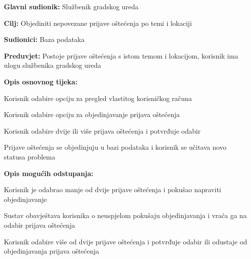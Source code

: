 \noindent {}
\begin{packed_item}

	\item \textbf{Glavni sudionik: } Službenik gradskog ureda
	\item  \textbf{Cilj:} Objediniti nepovezane prijave oštećenja po temi i lokaciji
	\item  \textbf{Sudionici:} Baza podataka
	\item  \textbf{Preduvjet:} Postoje prijave oštećenja s istom temom i lokacijom, korisnik ima ulogu službenika gradskog ureda
	\item  \textbf{Opis osnovnog tijeka:}

	\item[] \begin{packed_enum}

		\item Korisnik odabire opciju za pregled vlastitog korisničkog računa
		\item Korisnik odabire opciju za objedinjavanje prijava oštećenja
		\item Korisnik odabire dvije ili više prijava oštećenja i potvrđuje odabir
		\item Prijave oštećenja se objedinjuju u bazi podataka i korisnik se učitava novo statusa problema
	\end{packed_enum}

	\item  \textbf{Opis mogućih odstupanja:}

	\item[] \begin{packed_item}

		\item[3.a] Korisnik je odabrao manje od dvije prijave oštećenja i pokušao napraviti objedinjavanje
		\item[] \begin{packed_enum}

			\item Sustav obavještava korisnika o neuspjelom pokušaju objedinjavanja i vraća ga na odabir prijava oštećenja
			\item Korisnik odabire više od dvije prijave oštećenja i potvrđuje odabir ili odustaje od objedinjavanja prijava oštećenja
		\end{packed_enum}

	\end{packed_item}
\end{packed_item}


